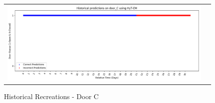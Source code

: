 \begin{center}
\begin{figure}[!Hp]
\begin{tabular}{cc}
    {\includegraphics[width = 6in]{images/results/Historical_door_C_HyT-EM.png}} \\
  \end{tabular}
  \caption{Historical Recreations - Door C}
\end{figure}\\ \\


\end{center}
